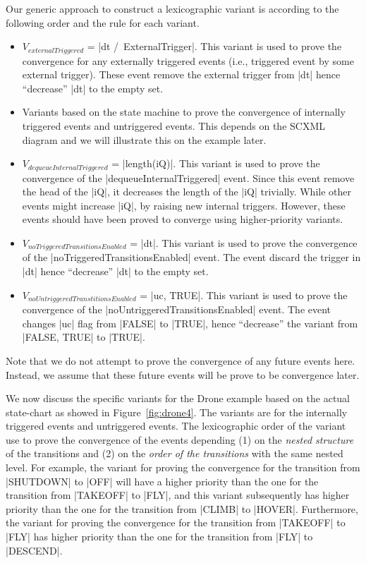 Our generic approach to construct a lexicographic variant is according
to the following order and the rule for each variant.
\begin{itemize}
\item $V_{externalTriggered}$ = |dt /\ ExternalTrigger|.  This variant
  is used to prove the convergence for any externally triggered events
  (i.e., triggered event by some external trigger). These event remove
  the external trigger from |dt| hence ``decrease'' |dt| to the empty
  set.

\item Variants based on the state machine to prove the convergence of
  internally triggered events and untriggered events.  This depends on
  the SCXML diagram and we will illustrate this on the example later.
  
\item $V_{dequeueInternalTriggered}$ = |length(iQ)|.  This variant is
  used to prove the convergence of the |dequeueInternalTriggered| event.
  Since this event remove the head of the |iQ|, it decreases the
  length of the |iQ| trivially.  While other events might increase
  |iQ|, by raising new internal triggers. However, these events should
  have been proved to converge using higher-priority variants.
  
\item $V_{noTriggeredTransitionsEnabled}$ = |dt|.  This variant is used to
  prove the convergence of the |noTriggeredTransitionsEnabled| event.
  The event discard the trigger in |dt| hence ``decrease'' |dt| to the
  empty set.
  
\item $V_{noUntriggeredTranstitionsEnabled}$ = |{uc, TRUE}|.  This variant is
  used to prove the convergence of the
  |noUntriggeredTransitionsEnabled| event.  The event changes |uc|
  flag from |FALSE| to |TRUE|, hence ``decrease'' the variant from
  |{FALSE, TRUE}| to |{TRUE}|.
\end{itemize}
Note that we do not attempt to prove the convergence of any future
events here. Instead, we assume that these future events will be prove
to be convergence later.

We now discuss the specific variants for the Drone example based on
the actual state-chart as showed in Figure~\ref{fig:drone4}.  The
variants are for the internally triggered events and untriggered
events. The lexicographic order of the variant use to prove the
convergence of the events depending (1) on the \emph{nested structure}
of the transitions and (2) on the \emph{order of the transitions} with
the same nested level.  For example, the variant for proving the
convergence for the transition from |SHUTDOWN| to |OFF| will have a
higher priority than the one for the transition from |TAKEOFF| to
|FLY|, and this variant subsequently has higher priority than the one
for the transition from |CLIMB| to |HOVER|.  Furthermore, the variant
for proving the convergence for the transition from |TAKEOFF| to |FLY|
has higher priority than the one for the transition from |FLY| to
|DESCEND|.

